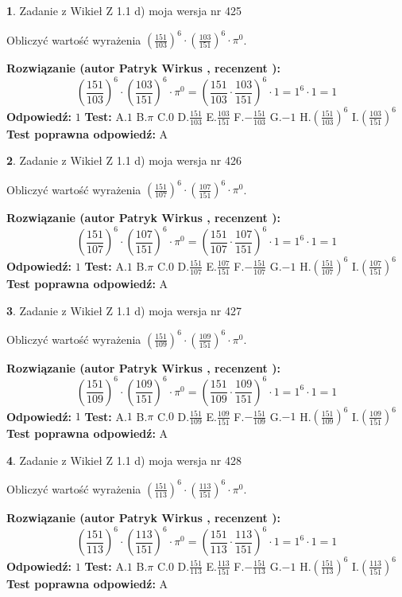 \documentclass[12pt, a4paper]{article}
\theoremstyle{definition} %
\newtheorem{zad}{}
\newcommand{\zadStart}[1]{\begin{zad}#1\newline}
\newcommand{\zadStop}{\end{zad}}
\newcommand{\rozwStart}[2]{\noindent \textbf{Rozwiązanie (autor #1 , recenzent #2): }\newline}
\newcommand{\rozwStop}{\newline}
\newcommand{\odpStart}{\noindent \textbf{Odpowiedź:}\newline}
\newcommand{\odpStop}{\newline}
\newcommand{\testStart}{\noindent \textbf{Test:}\newline}
\newcommand{\testStop}{\newline}
\newcommand{\kluczStart}{\noindent \textbf{Test poprawna odpowiedź:}\newline}
\newcommand{\kluczStop}{\newline}
\begin{document}
\zadStart{Zadanie z Wikieł Z 1.1 d) moja wersja nr 425}

Obliczyć wartość wyrażenia $(\frac{151}{103})^{6} \cdot (\frac{103}{151})^{6} \cdot \pi^{0}$.
\zadStop
\rozwStart{Patryk Wirkus}{}
$$(\frac{151}{103})^{6} \cdot (\frac{103}{151})^{6} \cdot \pi^{0} = (\frac{151}{103} \cdot \frac{103}{151})^{6} \cdot 1 = 1^{6} \cdot 1 = 1$$
\rozwStop
\odpStart
$1$
\odpStop
\testStart
A.$1$ B.$\pi$ C.$0$ D.$\frac{151}{103}$ E.$\frac{103}{151}$
F.$-\frac{151}{103}$ G.$-1$
H.$(\frac{151}{103})^{6}$
I.$(\frac{103}{151})^{6}$
\testStop
\kluczStart
A
\kluczStop



\zadStart{Zadanie z Wikieł Z 1.1 d) moja wersja nr 426}

Obliczyć wartość wyrażenia $(\frac{151}{107})^{6} \cdot (\frac{107}{151})^{6} \cdot \pi^{0}$.
\zadStop
\rozwStart{Patryk Wirkus}{}
$$(\frac{151}{107})^{6} \cdot (\frac{107}{151})^{6} \cdot \pi^{0} = (\frac{151}{107} \cdot \frac{107}{151})^{6} \cdot 1 = 1^{6} \cdot 1 = 1$$
\rozwStop
\odpStart
$1$
\odpStop
\testStart
A.$1$ B.$\pi$ C.$0$ D.$\frac{151}{107}$ E.$\frac{107}{151}$
F.$-\frac{151}{107}$ G.$-1$
H.$(\frac{151}{107})^{6}$
I.$(\frac{107}{151})^{6}$
\testStop
\kluczStart
A
\kluczStop



\zadStart{Zadanie z Wikieł Z 1.1 d) moja wersja nr 427}

Obliczyć wartość wyrażenia $(\frac{151}{109})^{6} \cdot (\frac{109}{151})^{6} \cdot \pi^{0}$.
\zadStop
\rozwStart{Patryk Wirkus}{}
$$(\frac{151}{109})^{6} \cdot (\frac{109}{151})^{6} \cdot \pi^{0} = (\frac{151}{109} \cdot \frac{109}{151})^{6} \cdot 1 = 1^{6} \cdot 1 = 1$$
\rozwStop
\odpStart
$1$
\odpStop
\testStart
A.$1$ B.$\pi$ C.$0$ D.$\frac{151}{109}$ E.$\frac{109}{151}$
F.$-\frac{151}{109}$ G.$-1$
H.$(\frac{151}{109})^{6}$
I.$(\frac{109}{151})^{6}$
\testStop
\kluczStart
A
\kluczStop



\zadStart{Zadanie z Wikieł Z 1.1 d) moja wersja nr 428}

Obliczyć wartość wyrażenia $(\frac{151}{113})^{6} \cdot (\frac{113}{151})^{6} \cdot \pi^{0}$.
\zadStop
\rozwStart{Patryk Wirkus}{}
$$(\frac{151}{113})^{6} \cdot (\frac{113}{151})^{6} \cdot \pi^{0} = (\frac{151}{113} \cdot \frac{113}{151})^{6} \cdot 1 = 1^{6} \cdot 1 = 1$$
\rozwStop
\odpStart
$1$
\odpStop
\testStart
A.$1$ B.$\pi$ C.$0$ D.$\frac{151}{113}$ E.$\frac{113}{151}$
F.$-\frac{151}{113}$ G.$-1$
H.$(\frac{151}{113})^{6}$
I.$(\frac{113}{151})^{6}$
\testStop
\kluczStart
A
\kluczStop
\end{document}
